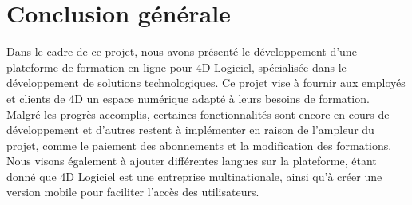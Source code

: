 \chapter*{Conclusion générale}

Dans le cadre de ce projet, nous avons présenté le développement d’une plateforme de formation en ligne pour 4D Logiciel, spécialisée dans le développement de solutions technologiques. Ce projet vise à fournir aux employés et clients de 4D un espace numérique adapté à leurs besoins de formation.\\


Malgré les progrès accomplis, certaines fonctionnalités sont encore en cours de développement et d'autres restent à implémenter en raison de l'ampleur du projet, comme le paiement des abonnements et la modification des formations. Nous visons également à ajouter différentes langues sur la plateforme, étant donné que 4D Logiciel est une entreprise multinationale, ainsi qu'à créer une version mobile pour faciliter l'accès des utilisateurs.\\